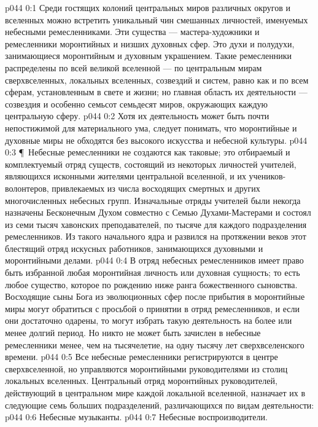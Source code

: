 \vs p044 0:1 Среди гостящих колоний центральных миров различных округов и вселенных можно встретить уникальный чин смешанных личностей, именуемых небесными ремесленниками. Эти существа --- мастера\hyp{}художники и ремесленники моронтийных и низших духовных сфер. Это духи и полудухи, занимающиеся моронтийным и духовным украшением. Такие ремесленники распределены по всей великой вселенной --- по центральным мирам сверхвселенных, локальных вселенных, созвездий и систем, равно как и по всем сферам, установленным в свете и жизни; но главная область их деятельности --- созвездия и особенно семьсот семьдесят миров, окружающих каждую центральную сферу.
\vs p044 0:2 Хотя их деятельность может быть почти непостижимой для материального ума, следует понимать, что моронтийные и духовные миры не обходятся без высокого искусства и небесной культуры.
\vs p044 0:3 \P\ Небесные ремесленники не создаются как таковые; это отбираемый и комплектуемый отряд существ, состоящий из некоторых личностей учителей, являющихся исконными жителями центральной вселенной, и их учеников\hyp{}волонтеров, привлекаемых из числа восходящих смертных и других многочисленных небесных групп. Изначальные отряды учителей были некогда назначены Бесконечным Духом совместно с Семью Духами\hyp{}Мастерами и состоял из семи тысяч хавонских преподавателей, по тысяче для каждого подразделения ремесленников. Из такого начального ядра и развился на протяжении веков этот блестящий отряд искусных работников, занимающихся духовными и моронтийными делами.
\vs p044 0:4 В отряд небесных ремесленников имеет право быть избранной любая моронтийная личность или духовная сущность; то есть любое существо, которое по рождению ниже ранга божественного сыновства. Восходящие сыны Бога из эволюционных сфер после прибытия в моронтийные миры могут обратиться с просьбой о принятии в отряд ремесленников, и если они достаточно одарены, то могут избрать такую деятельность на более или менее долгий период. Но никто не может быть зачислен в небесные ремесленники менее, чем на тысячелетие, на одну тысячу лет сверхвселенского времени.
\vs p044 0:5 Все небесные ремесленники регистрируются в центре сверхвселенной, но управляются моронтийными руководителями из столиц локальных вселенных. Центральный отряд моронтийных руководителей, действующий в центральном мире каждой локальной вселенной, назначает их в следующие семь больших подразделений, различающихся по видам деятельности:
\vs p044 0:6 \bibnobreakspace Небесные музыканты.
\vs p044 0:7 \bibnobreakspace Небесные воспроизводители.
